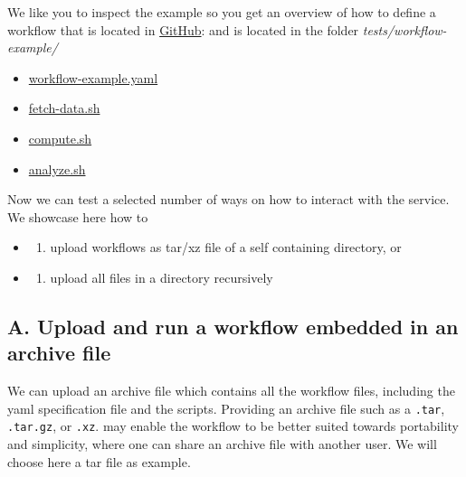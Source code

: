 We like you to inspect the example so you get an overview of how to
define a workflow that is located in
\href{https://github.com/cloudmesh/cloudmesh-cc/tree/main/tests/workflow-example}{GitHub}:
and is located in the folder \emph{tests/workflow-example/}

\begin{itemize}
\tightlist
\item
  \href{https://github.com/cloudmesh/cloudmesh-cc/blob/main/tests/workflow-example/workflow-example.yaml}{workflow-example.yaml}
\item
  \href{https://github.com/cloudmesh/cloudmesh-cc/blob/main/tests/workflow-example/fetch-data.sh}{fetch-data.sh}
\item
  \href{https://github.com/cloudmesh/cloudmesh-cc/blob/main/tests/workflow-example/compute.sh}{compute.sh}
\item
  \href{https://github.com/cloudmesh/cloudmesh-cc/blob/main/tests/workflow-example/analyze.sh}{analyze.sh}
\end{itemize}

Now we can test a selected number of ways on how to interact with the
service. We showcase here how to

\begin{itemize}
\item
  \begin{enumerate}
  \def\labelenumi{\Alph{enumi}.}
  \tightlist
  \item
    upload workflows as tar/xz file of a self containing directory, or
  \end{enumerate}
\item
  \begin{enumerate}
  \def\labelenumi{\Alph{enumi}.}
  \setcounter{enumi}{1}
  \tightlist
  \item
    upload all files in a directory recursively
  \end{enumerate}
\end{itemize}

\subsection{A. Upload and run a workflow embedded in an archive
file}\label{a.-upload-and-run-a-workflow-embedded-in-an-archive-file}

We can upload an archive file which contains all the workflow files,
including the yaml specification file and the scripts. Providing an
archive file such as a \texttt{.tar}, \texttt{.tar.gz}, or \texttt{.xz}.
may enable the workflow to be better suited towards portability and
simplicity, where one can share an archive file with another user. We
will choose here a tar file as example.

